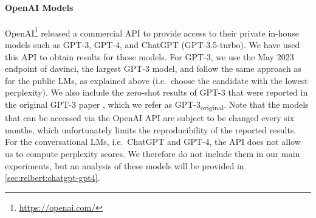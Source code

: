\documentclass[3p]{elsarticle}
\begin{document}
{\paragraph{OpenAI Models}
OpenAI\footnote{\url{https://openai.com/}} released a commercial API to provide access to their private in-house models such as GPT-3, GPT-4, and ChatGPT (GPT-3.5-turbo). We have used this API to obtain results for those models. For GPT-3, we use the May 2023 endpoint of davinci, the largest GPT-3 model, and follow the same approach as for the public LMs, as explained above (i.e.\ choose the candidate with the lowest perplexity).
We also include the zero-shot results of GPT-3 that were reported in the original GPT-3 paper \cite{GPT3}, which we refer as GPT-3\textsubscript{original}.
Note that the models that can be accessed via the OpenAI API are subject to be changed every six months, which unfortunately limits the reproducibility of the reported results. For the conversational LMs, i.e.\ ChatGPT and GPT-4, the API does not allow us to compute perplexity scores. We therefore do not include them in our main experiments, but an analysis of these models will be provided in \autoref{sec:relbert:chatgpt-gpt4}.

}
\end{document}
